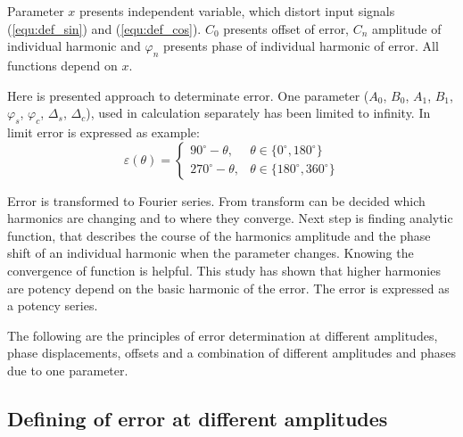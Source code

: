 \documentclass[a4paper]{article}
\begin{document}
Parameter $x$ presents independent variable, which distort input signals (\ref{equ:def_sin}) and (\ref{equ:def_cos}). 
 $C_0$ presents offset of error, $C_n$ amplitude of individual harmonic and $\varphi_n$ presents phase of individual harmonic of error. All functions depend on $x$.

Here is presented approach to determinate error. One parameter ($A_0$, $B_0$, $A_1$, $B_1$, $\varphi_{s}$, $\varphi_{c}$, $\Delta_s$, $\Delta_c$), used in calculation separately has been limited to infinity.
In limit error is expressed as example:
\begin{equation}
\label{equ:def_err_inf}
\varepsilon(\theta)=
\begin{cases}
90^\circ-\theta, & \theta \in \{0^\circ,180^\circ\}\\
270^\circ-\theta, & \theta \in \{180^\circ,360^\circ\}
\end{cases}
\end{equation}

Error is transformed to Fourier series. From transform can be decided which harmonics are changing and to where they converge. Next step is finding analytic function, that describes the course of the harmonics amplitude and the phase shift of an individual harmonic when the parameter changes. Knowing the convergence of function is helpful. This study has shown that higher harmonies are potency depend on the basic harmonic of the error. The error is expressed as a potency series.

The following are the principles of error determination at different amplitudes, phase displacements, offsets and a combination of different amplitudes and phases due to one parameter.

\subsection{Defining of error at different amplitudes}
\end{document}
